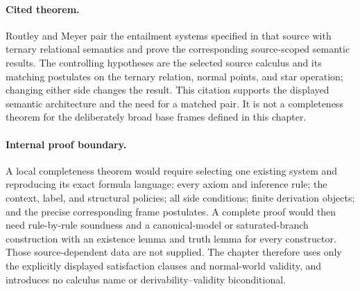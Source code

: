 \paragraph{Cited theorem.}
Routley and Meyer \cite[pp.~53--73]{RoutleyMeyer1972} pair the entailment
systems specified in that source with ternary relational semantics and prove
the corresponding source-scoped semantic results.  The controlling hypotheses
are the selected source calculus and its matching postulates on the ternary
relation, normal points, and star operation; changing either side changes the
result.  This citation supports the displayed semantic architecture and the
need for a matched pair.  It is not a completeness theorem for the deliberately
broad base frames defined in this chapter.

\paragraph{Internal proof boundary.}
A local completeness theorem would require selecting one existing system and
reproducing its exact formula language; every axiom and inference rule; the
context, label, and structural policies; all side conditions; finite derivation
objects; and the precise corresponding frame postulates.  A complete proof
would then need rule-by-rule soundness and a canonical-model or
saturated-branch construction with an existence lemma and truth lemma for
every constructor.  Those source-dependent data are not supplied.  The chapter
therefore uses only the explicitly displayed satisfaction clauses and
normal-world validity, and introduces no calculus name or
derivability--validity biconditional.

